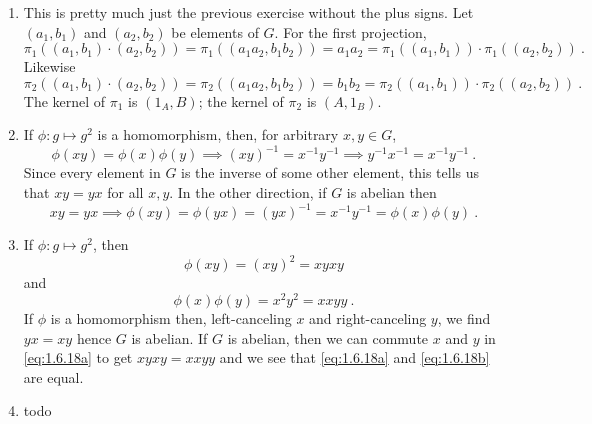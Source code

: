 \documentclass[]{article}
\begin{document}
\begin{enumerate}
\item This is pretty much just the previous exercise without the plus signs. Let $(a_1,b_1)$ and $(a_2,b_2)$ be elements of $G$. For the first projection,
\begin{equation}
\pi_1((a_1,b_1)\cdot(a_2,b_2)) = \pi_1((a_1a_2,b_1b_2)) = a_1a_2 = \pi_1((a_1,b_1))\cdot\pi_1((a_2,b_2))\ .
\end{equation}
Likewise
\begin{equation}
\pi_2((a_1,b_1)\cdot(a_2,b_2)) = \pi_2((a_1a_2,b_1b_2)) = b_1b_2 = \pi_2((a_1,b_1))\cdot\pi_2((a_2,b_2))\ .
\end{equation}
The kernel of $\pi_1$ is $(1_A,B)$; the kernel of $\pi_2$ is $(A,1_B)$.


\item If $\phi: g \mapsto g^2$ is a homomorphism, then, for arbitrary $x,y \in G$,
\begin{equation}
\phi(xy) = \phi(x)\phi(y) \implies (xy)^{-1} = x^{-1}y^{-1} \implies y^{-1}x^{-1} = x^{-1}y^{-1}\ .
\end{equation}
Since every element in $G$ is the inverse of some other element, this tells us that $xy = yx$ for all $x,y$. In the other direction, if $G$ is abelian then
\begin{equation}
xy = yx \implies \phi(xy) = \phi(yx) = (yx)^{-1} = x^{-1}y^{-1} = \phi(x)\phi(y)\ .
\end{equation}


\item If $\phi: g \mapsto g^2$, then
\begin{equation}
\phi(xy) = (xy)^2 = xyxy \label{eq:1.6.18a}
\end{equation}
and
\begin{equation}
\phi(x)\phi(y) = x^2y^2 = xxyy\ . \label{eq:1.6.18b}
\end{equation}
If $\phi$ is a homomorphism then, left-canceling $x$ and right-canceling $y$, we find $yx = xy$ hence $G$ is abelian. If $G$ is abelian, then we can commute $x$ and $y$ in \eqref{eq:1.6.18a} to get $xyxy = xxyy$ and we see that \eqref{eq:1.6.18a} and \eqref{eq:1.6.18b} are equal.


\item {\color{red} todo}



\end{enumerate}
\end{document}
